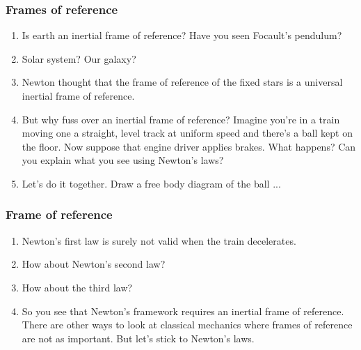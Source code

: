 \documentclass{beamer}
\begin{document}
\begin{frame}
\frametitle{Frames of reference}
\begin{enumerate}
\item Is earth an inertial frame of reference? Have you seen Focault's pendulum?
\item Solar system? Our galaxy?
\item Newton thought that the frame of reference of the fixed stars is a
universal inertial frame of reference.
\item But why fuss over an inertial frame of reference? Imagine you're in a
train moving one a straight, level track at uniform speed and there's a ball
kept on the floor. Now suppose that engine driver applies brakes. What happens?
Can you explain what you see using Newton's laws?
\item Let's do it together. Draw a free body diagram of the ball ...
\end{enumerate}
\end{frame}

\begin{frame}
\frametitle{Frame of reference}
\begin{enumerate}
\item Newton's first law is surely not valid when the train decelerates.
\item How about Newton's second law? 
\item How about the third law?
\item So you see that Newton's framework requires an inertial frame of 
reference. There are other ways to look at classical mechanics where frames of
reference are not as important. But let's stick to Newton's laws.
\end{enumerate}
\end{frame}
\end{document}
